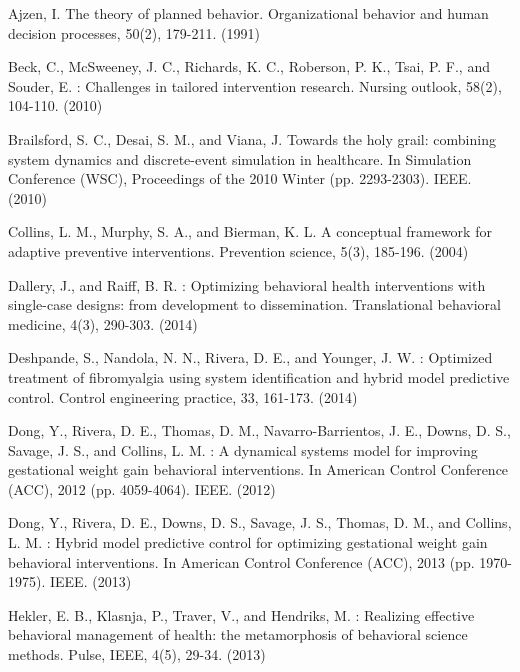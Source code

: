 \documentclass[runningheads,a4paper]{llncs}
\begin{document}

\begin{thebibliography}{4}

 Ajzen, I. The theory of planned behavior. Organizational behavior and human decision processes, 50(2), 179-211. (1991)

 Beck, C., McSweeney, J. C., Richards, K. C., Roberson, P. K., Tsai, P. F., and Souder, E. : Challenges in tailored intervention research. Nursing outlook, 58(2), 104-110. (2010)

 Brailsford, S. C., Desai, S. M., and Viana, J. Towards the holy grail: combining system dynamics and discrete-event simulation in healthcare. In Simulation Conference (WSC), Proceedings of the 2010 Winter (pp. 2293-2303). IEEE. (2010)

 Collins, L. M., Murphy, S. A., and Bierman, K. L. A conceptual framework for adaptive preventive interventions. Prevention science, 5(3), 185-196. (2004)

 Dallery, J., and Raiff, B. R. : Optimizing behavioral health interventions with single-case designs: from development to dissemination. Translational behavioral medicine, 4(3), 290-303. (2014)

 Deshpande, S., Nandola, N. N., Rivera, D. E., and Younger, J. W. : Optimized treatment of fibromyalgia using system identification and hybrid model predictive control. Control engineering practice, 33, 161-173. (2014)

 Dong, Y., Rivera, D. E., Thomas, D. M., Navarro-Barrientos, J. E., Downs, D. S., Savage, J. S., and Collins, L. M. : A dynamical systems model for improving gestational weight gain behavioral interventions. In American Control Conference (ACC), 2012 (pp. 4059-4064). IEEE. (2012)

 Dong, Y., Rivera, D. E., Downs, D. S., Savage, J. S., Thomas, D. M., and Collins, L. M. : Hybrid model predictive control for optimizing gestational weight gain behavioral interventions. In American Control Conference (ACC), 2013 (pp. 1970-1975). IEEE. (2013)

 Hekler, E. B., Klasnja, P., Traver, V., and Hendriks, M. : Realizing effective behavioral management of health: the metamorphosis of behavioral science methods. Pulse, IEEE, 4(5), 29-34. (2013)


\end{thebibliography}
\end{document}
